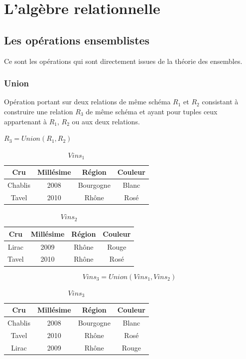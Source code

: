 \documentclass[12pt,a4paper,openany]{book}
\begin{document}
		\chapter{L'algèbre relationnelle}
		\section{Les opérations ensemblistes}
		Ce sont les opérations qui sont directement issues de la théorie des ensembles.
		\subsection{Union}
		\begin{definition}
			Opération portant sur deux relations de même schéma $R_1$ et $R_2$ consistant à construire une relation $R_3$ de même schéma et ayant
			pour tuples ceux appartenant à $R_1$, $R_2$ ou aux deux relations.
		\end{definition}
		\begin{notation}
			$R_3 = Union(R_1, R_2)$
		\end{notation}
		\begin{exemple}
			\begin{table}[H]
			\centering
			\begin{tabular}{c|c|c|c}
				\textbf{Cru} & \textbf{Millésime} & \textbf{Région} & \textbf{Couleur}\\
				\hline
				Chablis & 2008 & Bourgogne & Blanc\\
				Tavel & 2010 & Rhône & Rosé\\
			\end{tabular}
			\caption{$Vins_1$}
		\end{table}
		\begin{table}[H]
			\centering
			\begin{tabular}{c|c|c|c}
				\textbf{Cru} & \textbf{Millésime} & \textbf{Région} & \textbf{Couleur}\\
				\hline
				Lirac & 2009 & Rhône & Rouge \\
				Tavel & 2010 & Rhône & Rosé\\
			\end{tabular}
			\caption{$Vins_2$}
		\end{table}
		$$Vins_3 = Union(Vins_1, Vins_2)$$
		\begin{table}[H]
			\centering
			\begin{tabular}{c|c|c|c}
				\textbf{Cru} & \textbf{Millésime} & \textbf{Région} & \textbf{Couleur}\\
				\hline
				Chablis & 2008 & Bourgogne & Blanc\\
				Tavel & 2010 & Rhône & Rosé\\
				Lirac & 2009 & Rhône & Rouge \\
			\end{tabular}
			\caption{$Vins_3$}
		\end{table}
		\end{exemple}
\end{document}
